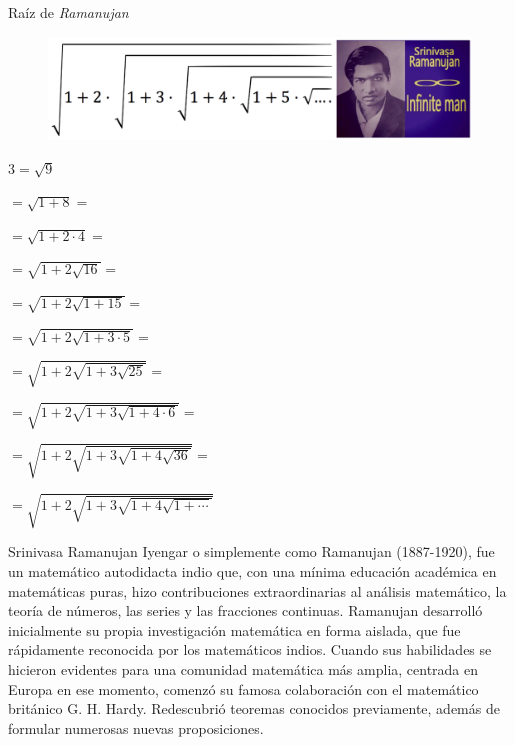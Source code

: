 \begin{myexampleblock}{Raíz de \emph{Ramanujan}}

\begin{figure}[H]
	\centering
	\includegraphics[width=1\textwidth]{img-reales/reales17.png}
	\end{figure}

\vspace{2mm}
\begin{multicols}{2}
	
	$3=\sqrt{9}$
	
	$=\sqrt{1+8}=$
	
	$=\sqrt{1+2\cdot 4}=$
	
	$=\sqrt{1+2\sqrt{16}}=$
	
	$=\sqrt{1+2\sqrt{1+15}}=$
	
	$=\sqrt{1+2\sqrt{1+3\cdot 5}}=$
	
	$=\sqrt{1+2\sqrt{1+3\sqrt{25}}}=$
	
	$=\sqrt{1+2\sqrt{1+3\sqrt{1+4\cdot 6}}}=$
	
	$=\sqrt{1+2\sqrt{1+3\sqrt{1+4\sqrt{36}}}}=$
	
	$=\sqrt{1+2\sqrt{1+3\sqrt{1+4\sqrt{1+\cdots}}}}$

\end{multicols}

\vspace{2mm}
Srinivasa Ramanujan Iyengar o simplemente como Ramanujan (1887-1920), fue un matemático autodidacta indio que, con una mínima educación académica en matemáticas puras, hizo contribuciones extraordinarias al análisis matemático, la teoría de números, las series y las fracciones continuas. Ramanujan desarrolló inicialmente su propia investigación matemática en forma aislada, que fue rápidamente reconocida por los matemáticos indios. Cuando sus habilidades se hicieron evidentes para una comunidad matemática más amplia, centrada en Europa en ese momento, comenzó su famosa colaboración con el matemático británico G. H. Hardy. Redescubrió teoremas conocidos previamente, además de formular numerosas nuevas proposiciones.

\vspace{2mm}


\end{myexampleblock}
